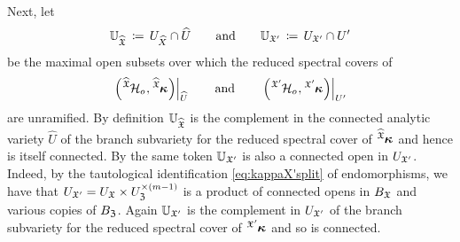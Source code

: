 \documentclass[twoside,leqno]{article}
\numberwithin{equation}{section}
\theoremstyle{plain}
\theoremstyle{definition}
\begin{document}
\smallskip


Next, let 
\[
\mathbb{U}_{\widehat{\mathfrak X}} \, \coloneqq \,  U_{\widehat{X}} \cap \widehat{U} \qquad \text{and}  
\qquad \mathbb{U}_{\mathfrak X'} \, \coloneqq \, U_{\mathfrak X'} \cap U'
\]
be the maximal open subsets over which the reduced spectral covers of 
\[\left.\left(\tensor[^{\widehat{\fX}}]{{\cH_{o}}}{},\tensor[^{\widehat{\fX}}]{\bkappa}{}\right)\right|_{\widehat{U}} \qquad\text{and}\qquad\left.\left(\tensor[^{\fX'}]{{\cH_{o}}}{},\tensor[^{\fX'}]{\bkappa}{}\right)\right|_{U'}\] are unramified.
By definition $\mathbb{U}_{\widehat{\mathfrak X}}$ is the complement in the connected analytic variety $\widehat{U}$ of the branch subvariety for the reduced spectral cover of $\tensor[^{\widehat{\fX}}]{\bkappa}{}$ and hence is itself connected. By the same token  $\mathbb{U}_{\mathfrak X'}$ is also a connected open in $U_{\mathfrak X'}$. Indeed, by the tautological identification \eqref{eq:kappaX'split} of endomorphisms, we have that $U_{\mathfrak X'} 
= U_{\mathfrak X}\times U_{\mathfrak Z}^{\times (m-1)}$ is a product of connected opens in $B_{\mathfrak X}$ and various copies of $B_{\mathfrak Z}$. Again $\mathbb{U}_{\mathfrak X'}$ is the complement in $U_{\mathfrak X'}$ 
of the branch subvariety for the reduced spectral cover of $\tensor[^{\fX'}]{\bkappa}{}$ and so is connected. 
\end{document}
